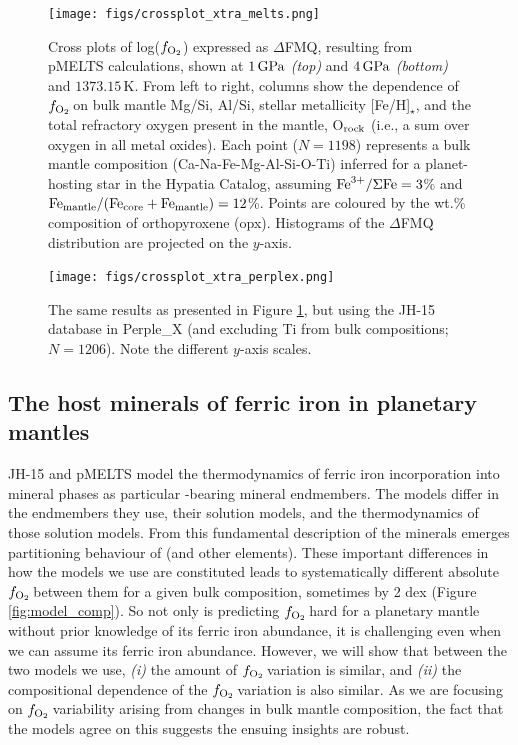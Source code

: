 \documentclass[fleqn,usenatbib,twocolumn]{mnras}
\newcommand{\fo}{$f_{\ce{O2}}$}
\newcommand{\ferric}{\ce{Fe^{3+}}}
\begin{document}
\begin{figure}
\centering
\texttt{[image: figs/crossplot\_xtra\_melts.png]}
\caption{\label{fig:xplots_mlts}Cross plots of log($f_{\ce{O2}}$) expressed as $\Delta$FMQ, resulting from pMELTS calculations, shown at $1\,{\rm GPa}$ \textit{(top)} and $4\,{\rm GPa}$ \textit{(bottom)} and $1373.15\,\text{K}$. From left to right, columns show the dependence of \fo\,on bulk mantle Mg/Si, Al/Si, stellar metallicity [Fe/H]$_\star$, and the total refractory oxygen present in the mantle, O$_{\rm rock}$ (i.e., a sum over oxygen in all metal oxides). Each point ($N = 1198$) represents a bulk mantle composition (Ca-Na-Fe-Mg-Al-Si-O-Ti) inferred for a planet-hosting star in the Hypatia Catalog, assuming ${\rm Fe}^{3+}/\Sigma{\rm Fe} = 3$\% and ${\rm Fe}_{\rm mantle}/({\rm Fe}_{\rm core} + {\rm Fe}_{\rm mantle}) = 12$\%. Points are coloured by the  wt.\% composition of orthopyroxene (opx). Histograms of the $\Delta$FMQ distribution are projected on the $y$-axis.}
\end{figure}

\begin{figure}
\centering
\texttt{[image: figs/crossplot\_xtra\_perplex.png]}
\caption{\label{fig:xplots_px}The same results as presented in Figure \ref{fig:xplots_mlts}, but using the JH-15 database in Perple\_X (and excluding Ti from bulk compositions; $N = 1206$). Note the different $y$-axis scales.}
\end{figure}



\subsection{The host minerals of ferric iron in planetary mantles}\label{sec:results-ferric-hosts}

JH-15 and pMELTS model the thermodynamics of ferric iron incorporation into mineral phases as particular \ferric-bearing mineral endmembers. The models differ in the endmembers they use, their solution models, and the thermodynamics of those solution models. From this fundamental description of the minerals emerges partitioning behaviour of \ferric\;(and other elements). These important differences in how the models we use are constituted leads to systematically different absolute \fo\,between them for a given bulk composition, sometimes by 2 dex (Figure \ref{fig:model_comp}). So not only is predicting \fo\,hard for a planetary mantle without prior knowledge of its ferric iron abundance, it is challenging even when we can assume its ferric iron abundance. However, we will show that between the two models we use, \textit{(i)} the amount of \fo\,variation is similar, and \textit{(ii)} the compositional dependence of the \fo\,variation is also similar. As we are focusing on \fo\,variability arising from changes in bulk mantle composition, the fact that the models agree on this suggests the ensuing insights are robust.
\end{document}
